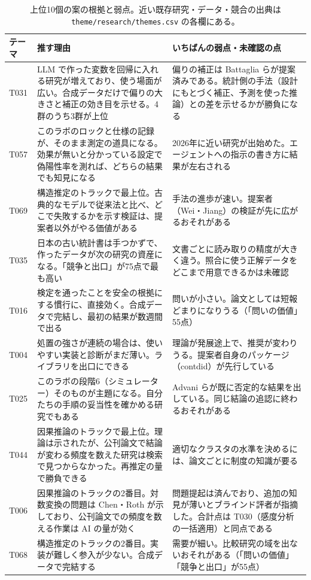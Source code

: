 \begin{table}[htbp]
\centering\small
\begin{tabularx}{\linewidth}{lXX}
\toprule
テーマ & 推す理由 & いちばんの弱点・未確認の点 \\
\midrule
T031 & LLM で作った変数を回帰に入れる研究が増えており、使う場面が広い。合成データだけで偏りの大きさと補正の効き目を示せる。4群のうち3群が上位 & 偏りの補正は Battaglia らが提案済みである。統計側の手法（設計にもとづく補正、予測を使った推論）との差を示せるかが勝負になる \\
T057 & このラボのロックと仕様の記録が、そのまま測定の道具になる。効果が無いと分かっている設定で偽陽性率を測れば、どちらの結果でも知見になる & 2026年に近い研究が出始めた。エージェントへの指示の書き方に結果が左右される \\
T069 & 構造推定のトラックで最上位。古典的なモデルで従来法と比べ、どこで失敗するかを示す検証は、提案者以外がやる価値がある & 手法の進歩が速い。提案者（Wei・Jiang）の検証が先に広がるおそれがある \\
T035 & 日本の古い統計書は手つかずで、作ったデータが次の研究の資産になる。「競争と出口」が75点で最も高い & 文書ごとに読み取りの精度が大きく違う。照合に使う正解データをどこまで用意できるかは未確認 \\
T016 & 検定を通ったことを安全の根拠にする慣行に、直接効く。合成データで完結し、最初の結果が数週間で出る & 問いが小さい。論文としては短報どまりになりうる（「問いの価値」55点） \\
T004 & 処置の強さが連続の場合は、使いやすい実装と診断がまだ薄い。ライブラリを出口にできる & 理論が発展途上で、推奨が変わりうる。提案者自身のパッケージ（contdid）が先行している \\
T025 & このラボの段階6（シミュレーター）そのものが主題になる。自分たちの手順の妥当性を確かめる研究でもある & Advani らが既に否定的な結果を出している。同じ結論の追認に終わるおそれがある \\
T044 & 因果推論のトラックで最上位。理論は示されたが、公刊論文で結論が変わる頻度を数えた研究は検索で見つからなかった。再推定の量で勝負できる & 適切なクラスタの水準を決めるには、論文ごとに制度の知識が要る \\
T006 & 因果推論のトラックの2番目。対数変換の問題は Chen・Roth が示しており、公刊論文での頻度を数える作業は AI の量が効く & 問題提起は済んでおり、追加の知見が薄いとブラインド評者が指摘した。合計点は T030（感度分析の一括適用）と同点である \\
T068 & 構造推定のトラックの2番目。実装が難しく参入が少ない。合成データで完結する & 需要が細い。比較研究の域を出ないおそれがある（「問いの価値」「競争と出口」が55点） \\
\bottomrule
\end{tabularx}
\caption{上位10個の案の根拠と弱点。近い既存研究・データ・競合の出典は \texttt{theme/research/themes.csv} の各欄にある。}
\label{tab:th-top10why}
\end{table}
